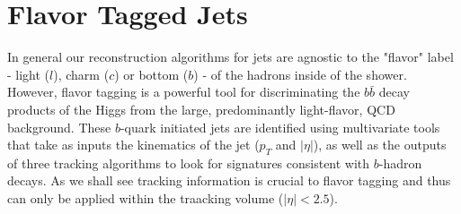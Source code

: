 \section{Flavor Tagged Jets} \label{sec:objects:flavor_tagging}

In general our reconstruction algorithms for jets are agnostic to the "flavor"
label - light ($l$), charm ($c$) or bottom ($b$) - of the hadrons inside of
the shower.  However, flavor tagging \cite{Aad:2015ydr} is a powerful tool for
discriminating the $b\bar{b}$ decay products of the Higgs from the large,
predominantly light-flavor, QCD background.  These $b$-quark initiated jets are
identified using multivariate tools that take as inputs the kinematics of the
jet ($p_{T}$ and $|\eta|$), as well as the outputs of three tracking algorithms
to look for signatures consistent with $b$-hadron decays.  As we shall see
tracking information is crucial to flavor tagging and thus can only be applied
within the traacking volume ($|\eta| < 2.5$).


